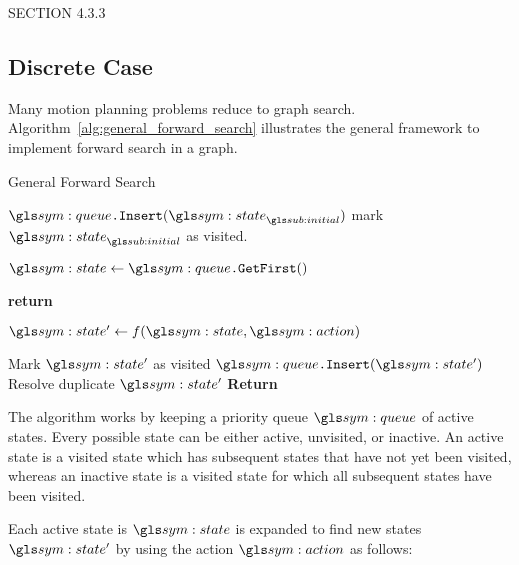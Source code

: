 		SECTION 4.3.3

	\subsection{Discrete Case}%
	\label{sec:discrete_case}


		Many motion planning problems reduce to graph search.
		Algorithm~\ref{alg:general_forward_search}\cite[adapted
		from][]{bib:planning:planning_algorithms} illustrates the general
		framework to implement forward search in a graph.

		\begin{algorithm}[ht]
			\caption{General Forward Search}\label{alg:general_forward_search}
			\begin{algorithmic}[1]

					\State{} $\queue\code{.Insert}(\state_{\initial})$
					\State{} mark $\state_{\initial}$ as visited.

					\While{$\queue \neq \emptyset$}

						\State{} $\state \gets \queue\code{.GetFirst}()$
						\If{$\state \in \statespace_{\goal}$}

							\State{} \textbf{return} 

						\EndIf{}

						\ForAll{$\action \in \actionspace(\state)$}
							\State{} $\state' \gets f(\state, \action)$

								\State{} Mark $\state'$ as visited
								\State{} $\queue\code{.Insert}(\state')$
							\Else{}
								\State{} Resolve duplicate $\state'$
							\EndIf{}
						\EndFor{}
					\EndWhile{}
					\State{} \textbf{Return} 
				\EndProcedure{}
			\end{algorithmic}
		\end{algorithm}

		The algorithm works by keeping a priority queue $\queue$ of active
		states. Every possible state can be either active, unvisited, or
		inactive. An active state is a visited state which has subsequent states
		that have not yet been visited, whereas an inactive state is a visited
		state for which all subsequent states have been visited.

		Each active state is $\state$ is expanded to find new states $\state'$
		by using the action $\action$ as follows:

